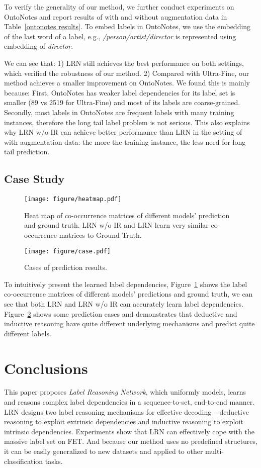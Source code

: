 \documentclass[11pt]{article}
\begin{document}
To verify the generality of our method, we further conduct experiments on OntoNotes and report results of with and without augmentation data in Table~\ref{ontonotes results}. To embed labels in OntoNotes, we use the embedding of the last word of a label, e.g., \textit{/person/artist/director} is represented using embedding of \textit{director}.

We can see that: 1) LRN still achieves the best performance on both settings, which verified the robustness of our method. 2) Compared with Ultra-Fine, our method achieves a smaller improvement on OntoNotes. We found this is mainly because: First, OntoNotes has weaker label dependencies for its label set is smaller (89 vs 2519 for Ultra-Fine) and most of its labels are coarse-grained. Secondly, most labels in OntoNotes are frequent labels with many training instances, therefore the long tail label problem is not serious. This also explains why LRN \small w/o IR \normalsize can achieve better performance than LRN in the setting of with augmentation data: the more the training instance, the less need for long tail prediction.
\subsection{Case Study}
\begin{figure}[htb!]
\centering
\texttt{[image: figure/heatmap.pdf]}
\caption{Heat map of co-occurrence matrices of different models' prediction and ground truth. LRN w/o IR and LRN learn very similar co-occurrence matrices to Ground Truth.}
\label{Fig.heatmap}
\end{figure}
\begin{figure}[htb!]
\setlength{\belowcaptionskip}{-0cm}
\centering
\texttt{[image: figure/case.pdf]} 
\caption{Cases of prediction results.}
\label{Fig.case} 
\end{figure}
To intuitively present the learned label dependencies, Figure~\ref{Fig.heatmap} shows the label co-occurrence matrices of different models' predictions and ground truth, we can see that both LRN and LRN \small w/o IR \normalsize can accurately learn label dependencies. Figure~\ref{Fig.case} shows some prediction cases and demonstrates that deductive and inductive reasoning have quite different underlying mechanisms and predict quite different labels.
\section{Conclusions}
This paper proposes \textit{Label Reasoning Network}, which uniformly models, learns and reasons complex label dependencies in a sequence-to-set, end-to-end manner. LRN designs two label reasoning mechanisms for effective decoding -- deductive reasoning to exploit extrinsic dependencies and inductive reasoning to exploit intrinsic dependencies. Experiments show that LRN can effectively cope with the massive label set on FET. And because our method uses no predefined structures, it can be easily generalized to new datasets and applied to other multi-classification tasks.
\end{document}
